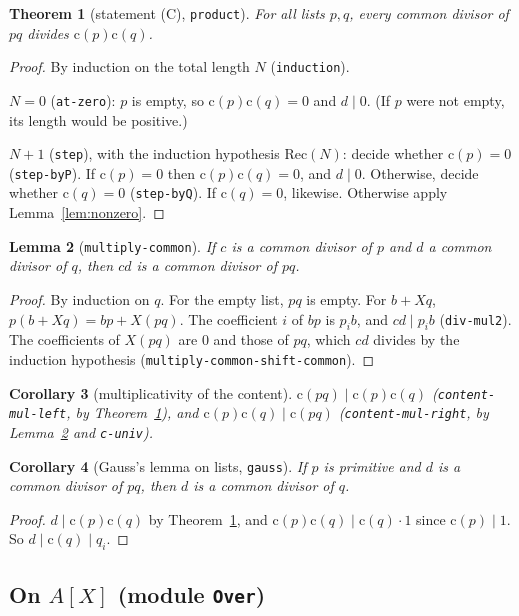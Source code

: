 \documentclass[11pt]{amsart}
\newtheorem{theorem}{Theorem}[section]
\newtheorem{lemma}[theorem]{Lemma}
\newtheorem{corollary}[theorem]{Corollary}
\theoremstyle{definition}
\theoremstyle{remark}
\newcommand{\nm}[1]{\textup{\texttt{#1}}}
\newcommand{\cont}{\mathrm{c}}
\begin{document}
\begin{theorem}[statement (C), \nm{product}]\label{thm:C}
For all lists $p,q$, every common divisor of $pq$ divides
$\cont(p)\cont(q)$.
\end{theorem}
\begin{proof}
By induction on the total length $N$ (\nm{induction}).

$N=0$ (\nm{at-zero}): $p$ is empty, so $\cont(p)\cont(q) = 0$ and $d\mid0$.
(If $p$ were not empty, its length would be positive.)

$N+1$ (\nm{step}), with the induction hypothesis $\mathrm{Rec}(N)$:
decide whether $\cont(p) = 0$ (\nm{step-byP}).
If $\cont(p)=0$ then $\cont(p)\cont(q)=0$, and $d\mid0$.
Otherwise, decide whether $\cont(q)=0$ (\nm{step-byQ}). If $\cont(q)=0$,
likewise. Otherwise apply Lemma~\ref{lem:nonzero}.
\end{proof}

\begin{lemma}[\nm{multiply-common}]\label{lem:multcommon}
If $c$ is a common divisor of $p$ and $d$ a common divisor of $q$, then
$cd$ is a common divisor of $pq$.
\end{lemma}
\begin{proof}
By induction on $q$. For the empty list, $pq$ is empty. For $b+Xq$,
$p(b+Xq) = bp + X(pq)$. The coefficient $i$ of $bp$ is $p_ib$, and
$cd\mid p_ib$ (\nm{div-mul2}). The coefficients of $X(pq)$ are $0$ and
those of $pq$, which $cd$ divides by the induction hypothesis
(\nm{multiply-common-shift-common}).
\end{proof}

\begin{corollary}[multiplicativity of the content]
$\cont(pq)\mid\cont(p)\cont(q)$ (\nm{content-mul-left}, by
Theorem~\ref{thm:C}), and $\cont(p)\cont(q)\mid\cont(pq)$
(\nm{content-mul-right}, by Lemma~\ref{lem:multcommon} and \nm{c-univ}).
\end{corollary}

\begin{corollary}[Gauss's lemma on lists, \nm{gauss}]\label{cor:gauss}
If $p$ is primitive and $d$ is a common divisor of $pq$, then $d$ is a
common divisor of $q$.
\end{corollary}
\begin{proof}
$d\mid\cont(p)\cont(q)$ by Theorem~\ref{thm:C}, and
$\cont(p)\cont(q)\mid\cont(q)\cdot 1$ since $\cont(p)\mid1$. So
$d\mid\cont(q)\mid q_i$.
\end{proof}

\subsection{On $A[X]$ (module \nm{Over})}
\end{document}
